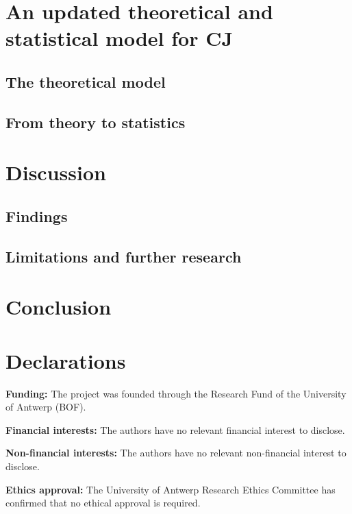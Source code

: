 \documentclass[
  authoryear,
  preprint,
  1p]{elsarticle}
\begin{document}
\section{An updated theoretical and statistical model for
CJ}\label{sec-theory}

\subsection{The theoretical model}\label{sec-theory-theoretical}

\subsection{From theory to statistics}\label{sec-theory-statistics}

\section{Discussion}\label{sec-discuss}

\subsection{Findings}\label{sec-discuss-finding}

\subsection{Limitations and further
research}\label{sec-discuss-limitations}

\section{Conclusion}\label{sec-conclusion}

\newpage{}

\section*{Declarations}\label{declarations}

\textbf{Funding:} The project was founded through the Research Fund of
the University of Antwerp (BOF).

\textbf{Financial interests:} The authors have no relevant financial
interest to disclose.

\textbf{Non-financial interests:} The authors have no relevant
non-financial interest to disclose.

\textbf{Ethics approval:} The University of Antwerp Research Ethics
Committee has confirmed that no ethical approval is required.
\end{document}
